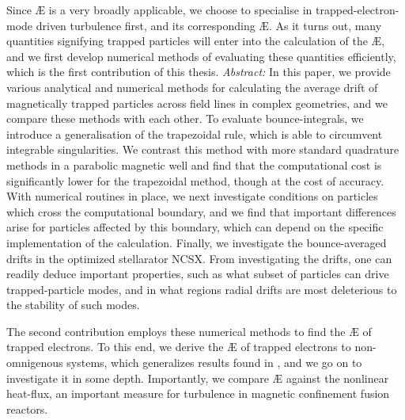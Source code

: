 Since \AE{} is a very broadly applicable, we choose to specialise in trapped-electron-mode driven turbulence first, and its corresponding \AE{}. As it turns out, many quantities signifying trapped particles will enter into the calculation of the \AE{}, and we first develop numerical methods of evaluating these quantities efficiently, which is the first contribution of this thesis.
\textit{Abstract:} In this paper, we provide various analytical and numerical methods for calculating the average drift of magnetically trapped particles across field lines in complex geometries, and we compare these methods with each other. To evaluate bounce-integrals, we introduce a generalisation of the trapezoidal rule, which is able to circumvent integrable singularities. We contrast this method with more standard quadrature methods in a parabolic magnetic well and find that the computational cost is significantly lower for the trapezoidal method, though at the cost of accuracy. With numerical routines in place, we next investigate conditions on particles which cross the computational boundary, and we find that important differences arise for particles affected by this boundary, which can depend on the specific implementation of the calculation. Finally, we investigate the bounce-averaged drifts in the optimized stellarator NCSX. From investigating the drifts, one can readily deduce important properties, such as what subset of particles can drive trapped-particle modes, and in what regions radial drifts are most deleterious to the stability of such modes.
 \par 
The second contribution employs these numerical methods to find the \AE{} of trapped electrons. To this end, we derive the \AE{} of trapped electrons to non-omnigenous systems, which generalizes results found in \citet{helander2020available}, and we go on to investigate it in some depth. Importantly, we compare \AE{} against the nonlinear heat-flux, an important measure for turbulence in magnetic confinement fusion reactors. 
 \\
